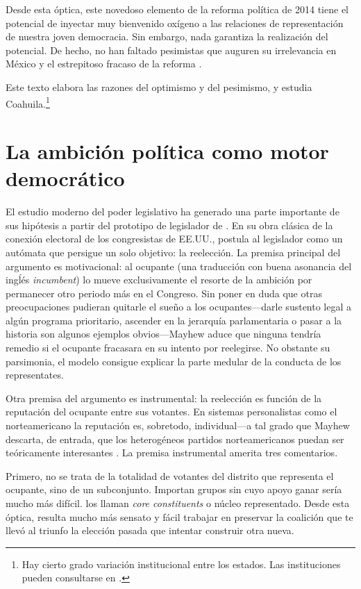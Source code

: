 \documentclass[letter,12pt]{article}
\begin{document}
Desde esta óptica, este novedoso elemento de la reforma política de 2014 tiene el potencial de inyectar muy bienvenido oxígeno a las relaciones de representación de nuestra joven democracia. Sin embargo, nada garantiza la realización del potencial. De hecho, no han faltado pesimistas que auguren su irrelevancia en México y el estrepitoso fracaso de la reforma \citep{merinoFierroZarkin2013Blog}. 

Este texto elabora las razones del optimismo y del pesimismo, y estudia Coahuila.\footnote{Hay cierto grado variación institucional entre los estados. Las instituciones pueden consultarse en \citet{magarInstReel.2017}.}

\section{La ambición política como motor democrático}

\noindent El estudio moderno del poder legislativo ha generado una parte importante de sus hipótesis a partir del prototipo de legislador de \citet{mayhew.1974}. En su obra clásica de la conexión electoral de los congresistas de EE.UU., postula al legislador como un autómata que persigue un solo objetivo: la reelección. La premisa principal del argumento es motivacional: al ocupante (una traducción con buena asonancia del ingĺés \emph{incumbent}) lo mueve exclusivamente el resorte de la ambición por permanecer otro periodo más en el Congreso. Sin poner en duda que otras preocupaciones pudieran quitarle el sueño a los ocupantes---darle sustento legal a algún programa prioritario, ascender en la jerarquía parlamentaria o pasar a la historia son algunos ejemplos obvios---Mayhew aduce que ninguna tendría remedio si el ocupante fracasara en su intento por reelegirse. No obstante su parsimonia, el modelo consigue explicar la parte medular de la conducta de los representates. 

Otra premisa del argumento es instrumental: la reelección es función de la reputación del ocupante entre sus votantes. En sistemas personalistas como el norteamericano la reputación es, sobretodo, individual---a tal grado que Mayhew descarta, de entrada, que los heterogéneos partidos norteamericanos puedan ser teóricamente interesantes \citep[aunque el revisionismo ha recuperado la relevancia de los partidos,][]{cox.mccubbins.1993,aldrich.1995}. La premisa instrumental amerita tres comentarios. 

Primero, no se trata de la totalidad de votantes del distrito que representa el ocupante, sino de un subconjunto. Importan grupos sin cuyo apoyo ganar sería mucho más difícil. \citet{cox.mccubbins.1986} los llaman \emph{core constituents} o núcleo representado. Desde esta óptica, resulta mucho más sensato y fácil trabajar en preservar la coalición que te llevó al triunfo la elección pasada que intentar construir otra nueva.
\end{document}
